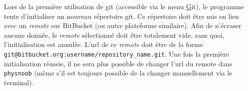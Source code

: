 \begin{theory}[title=Intégration à git]
	Lors de la première utilisation de git (accessible via le menu
	\underline{G}it), le programme tente d'initialiser un nouveau répertoire
	git. Ce répertoire doit être mis en lien avec un \emph{remote} sur
	BitBucket (ou autre plateforme similaire). Afin de n'écraser aucune donnée,
	le \emph{remote} sélectionné doit être totalement vide, sans quoi,
	l'initialisation est annulée. L'url de ce \emph{remote} doit être de la
	forme \texttt{git@bitbucket.org:username/repository\_name.git}. Une fois la
	première initialisation réussie, il ne sera plus possible de changer l'url
	du remote dans \verb|physnoob| (même s'il est toujours possible de la
	changer manuellement via le terminal). 
\end{theory}
